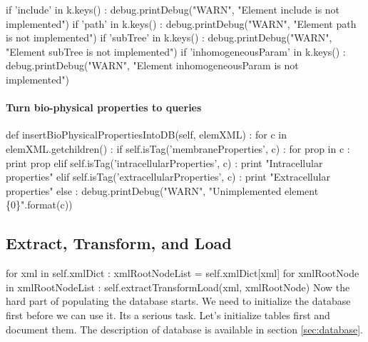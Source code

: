 \documentclass[]{article}%
\begin{document}
      if 'include' in k.keys() : 
        debug.printDebug("WARN", "Element include is not implemented")
      if 'path' in k.keys() : 
        debug.printDebug("WARN", "Element path is not implemented")
      if 'subTree' in k.keys() :
        debug.printDebug("WARN", "Element subTree is not implemented")
      if 'inhomogeneousParam' in k.keys() : 
        debug.printDebug("WARN", "Element inhomogeneousParam is not implemented")

\eatline
{}\nwendcode{}\nwdocspar
\paragraph{Turn bio-physical properties to queries}

\nwenddocs{}\endmoddef\nwstartdeflinemarkup{}\nwenddeflinemarkup
def insertBioPhysicalPropertiesIntoDB(self, elemXML) :
    for c in elemXML.getchildren() :
      if self.isTag('membraneProperties', c) :
        for prop in c :
          print prop
      elif self.isTag('intracellularProperties', c) :
        print "Intracellular properties"
      elif self.isTag('extracellularProperties', c) :
        print "Extracellular properties"
      else :
        debug.printDebug("WARN", "Unimplemented element \{0\}".format(c))

\eatline
{}\nwendcode{}\subsection{Extract, Transform, and Load}

\nwenddocs{}\endmoddef\nwstartdeflinemarkup{}\nwenddeflinemarkup
for xml in self.xmlDict :
  xmlRootNodeList = self.xmlDict[xml]
  for xmlRootNode in xmlRootNodeList :
    self.extractTransformLoad(xml, xmlRootNode)
\eatline
{}\nwendcode{}\nwdocspar
  Now the hard part of populating the database starts. We need to initialize the
  database first before we can use it. Its a serious task. Let's initialize
  tables first and document them. The description of database is available in
  section \ref{sec:database}.
\end{document}
